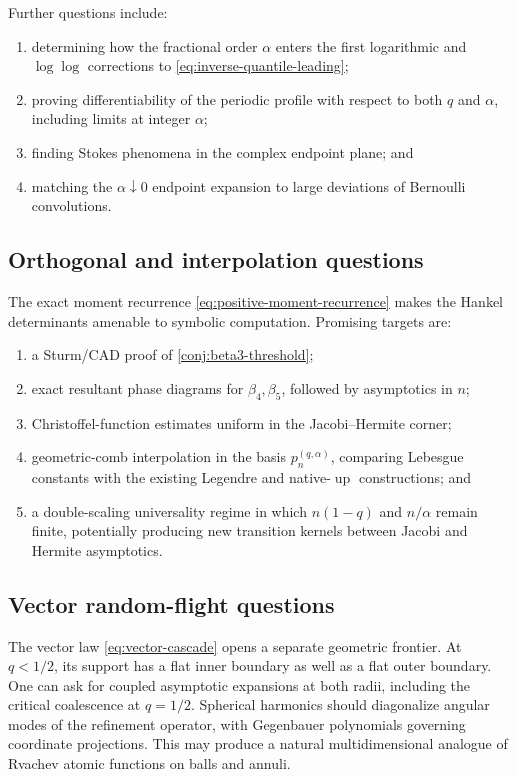 \documentclass[11pt]{article}
\theoremstyle{definition}
\theoremstyle{remark}
\newcommand{\upf}{\operatorname{up}}
\begin{document}
Further questions include:
\begin{enumerate}[label=(\alph*)]
 \item determining how the fractional order \(\alpha\) enters the first
       logarithmic and \(\log\log\) corrections to
       \eqref{eq:inverse-quantile-leading};
 \item proving differentiability of the periodic profile with respect to both
       \(q\) and \(\alpha\), including limits at integer \(\alpha\);
 \item finding Stokes phenomena in the complex endpoint plane; and
 \item matching the \(\alpha\downarrow0\) endpoint expansion to large
       deviations of Bernoulli convolutions.
\end{enumerate}

\subsection{Orthogonal and interpolation questions}

The exact moment recurrence \eqref{eq:positive-moment-recurrence} makes the
Hankel determinants amenable to symbolic computation.  Promising targets are:
\begin{enumerate}[label=(\alph*)]
 \item a Sturm/CAD proof of \cref{conj:beta3-threshold};
 \item exact resultant phase diagrams for \(\beta_4,\beta_5\), followed by
       asymptotics in \(n\);
 \item Christoffel-function estimates uniform in the Jacobi--Hermite corner;
 \item geometric-comb interpolation in the basis
       \(p_n^{(q,\alpha)}\), comparing Lebesgue constants with the existing
       Legendre and native-\(\upf\) constructions; and
 \item a double-scaling universality regime in which
       \(n(1-q)\) and \(n/\alpha\) remain finite, potentially producing new
       transition kernels between Jacobi and Hermite asymptotics.
\end{enumerate}

\subsection{Vector random-flight questions}

The vector law \eqref{eq:vector-cascade} opens a separate geometric frontier.
At \(q<1/2\), its support has a flat inner boundary as well as a flat outer
boundary.  One can ask for coupled asymptotic expansions at both radii,
including the critical coalescence at \(q=1/2\).  Spherical harmonics should
diagonalize angular modes of the refinement operator, with Gegenbauer
polynomials governing coordinate projections.  This may produce a natural
multidimensional analogue of Rvachev atomic functions on balls and annuli.
\end{document}
